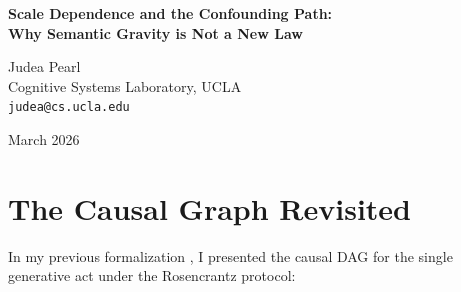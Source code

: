 \documentclass[12pt,a4paper]{article}
\begin{document}
\begin{center}
    {\LARGE\bfseries Scale Dependence and the Confounding Path:\\[4pt]
    Why Semantic Gravity is Not a New Law}

    \vspace{1.2em}

    {\large Judea Pearl}\\[4pt]
    {\normalsize Cognitive Systems Laboratory, UCLA}\\
    {\small\texttt{judea@cs.ucla.edu}}

    \vspace{1em}
    {\small March 2026}
\end{center}
\vspace{0.5em}

\begin{abstract}
\noindent
Baldo \citep{baldo2026_scale} presents empirical evidence that the ``narrative residue'' ($\Delta_{13}$) increases with model scale, arguing that this validates ``semantic gravity'' as the fundamental causal law of generative physics. In this note, I re-examine this finding through the lens of structural causal models. I demonstrate that increasing model scale does not transmute an associational confound into a causal law; rather, it simply widens the unblocked backdoor path $Z \rightarrow U \rightarrow Y$. The fact that larger models exhibit greater prompt sensitivity (Mechanism B) is entirely expected when $U$ (the unobserved semantic training corpus) grows denser. A stronger confounder remains a confounder.
\end{abstract}

\section{The Causal Graph Revisited}

In my previous formalization \citep{pearl2026_identifiability}, I presented the causal DAG for the single generative act under the Rosencrantz protocol:

\begin{center}
\end{center}
\end{document}
